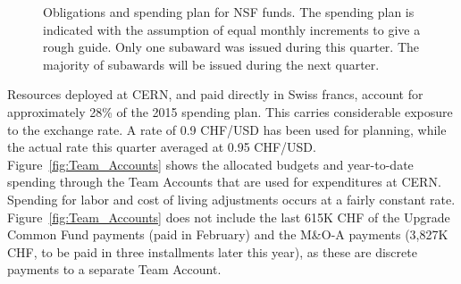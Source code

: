 \begin{figure}[hbtp]
  \begin{center}
    \caption{Obligations and spending plan for NSF funds.  The spending plan
is indicated with the assumption of equal monthly increments to give a rough guide.
Only one subaward was issued during this quarter.  The majority of subawards will
be issued during the next quarter.}
    \label{fig:NSF_obligations}
  \end{center}
\end{figure}

Resources deployed at CERN, and paid directly in Swiss francs, account for approximately 28\% of the 2015 spending plan.  This carries considerable exposure to the exchange rate. A rate of 0.9 CHF/USD has been used for planning, while the actual rate this quarter averaged at 0.95 CHF/USD.  Figure\ \ref{fig:Team_Accounts} shows the allocated budgets and year-to-date spending through the Team Accounts that are used for expenditures at CERN.  Spending for labor and cost of living adjustments occurs at a fairly constant rate.  Figure\ \ref{fig:Team_Accounts} does not include the last 615K CHF of the Upgrade Common Fund payments (paid in February) and the M\&O-A payments (3,827K CHF, to be paid in three installments later this year), as these are discrete payments to a separate Team Account.

